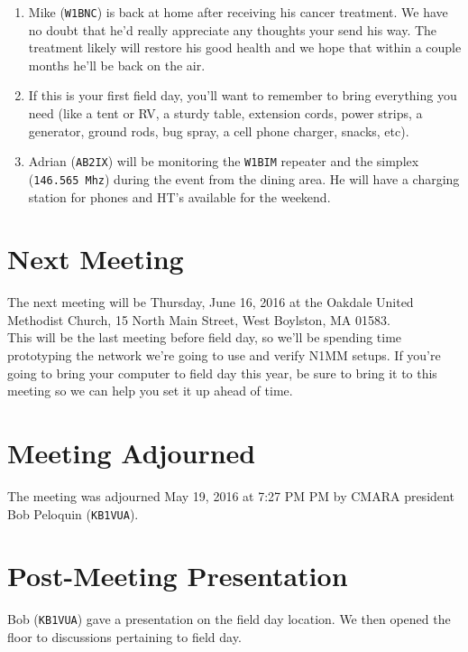 \documentclass[10pt,letterpaper]{article}
\begin{document}
\begin{enumerate}
\item Mike (\texttt{W1BNC}) is back at home after receiving his cancer treatment. We have no doubt that he'd really appreciate any thoughts your send his way. The treatment likely will restore his good health and we hope that within a couple months he'll be back on the air.
\item If this is your first field day, you'll want to remember to bring everything you need (like a tent or RV, a sturdy table, extension cords, power strips, a generator, ground rods, bug spray, a cell phone charger, snacks, etc).
\item Adrian (\texttt{AB2IX}) will be monitoring the \texttt{W1BIM} repeater and the simplex (\texttt{146.565 Mhz}) during the event from the dining area. He will have a charging station for phones and HT's available for the weekend.
\end{enumerate}

\section{Next Meeting}

The next meeting will be Thursday, June 16, 2016 at the Oakdale United Methodist Church, 15 North Main Street, West Boylston, MA 01583.\\

\noindent
This will be the last meeting before field day, so we'll be spending time prototyping the network we're going to use and verify N1MM setups. If you're going to bring your computer to field day this year, be sure to bring it to this meeting so we can help you set it up ahead of time.

\section{Meeting Adjourned}
The meeting was adjourned May 19, 2016 at 7:27 PM PM by CMARA president Bob Peloquin (\texttt{KB1VUA}).

\section{Post-Meeting Presentation}

Bob (\texttt{KB1VUA}) gave a presentation on the field day location. We then opened the floor to discussions pertaining to field day.
\end{document}
